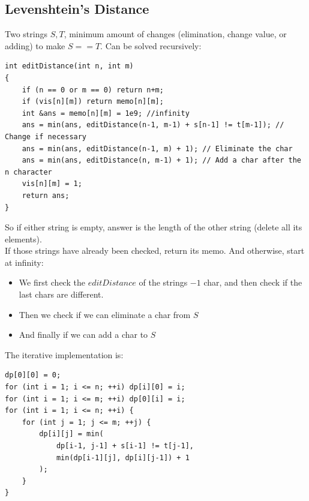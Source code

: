 \documentclass{IEEEtran}
\begin{document}
        \subsection{Levenshtein's Distance}
            Two strings $S,T$, minimum amount of changes (elimination, change value, or adding) to make $S == T$. Can be solved recursively:
            \begin{lstlisting}
int editDistance(int n, int m) 
{ 
	if (n == 0 or m == 0) return n+m;
	if (vis[n][m]) return memo[n][m];
	int &ans = memo[n][m] = 1e9; //infinity
	ans = min(ans, editDistance(n-1, m-1) + s[n-1] != t[m-1]); // Change if necessary
	ans = min(ans, editDistance(n-1, m) + 1); // Eliminate the char
	ans = min(ans, editDistance(n, m-1) + 1); // Add a char after the n character
	vis[n][m] = 1;
	return ans;
}
            \end{lstlisting}
            So if either string is empty, answer is the length of the other string (delete all its elements).\\
            If those strings have already been checked, return its memo. And otherwise, start at infinity:
            \begin{itemize}
                \item We first check the $editDistance$ of the strings $-1$ char, and then check if the last chars are different.
                \item Then we check if we can eliminate a char from $S$
                \item And finally if we can add a char to $S$
            \end{itemize}
            The iterative implementation is:
            \begin{lstlisting}
dp[0][0] = 0;
for (int i = 1; i <= n; ++i) dp[i][0] = i;
for (int i = 1; i <= m; ++i) dp[0][i] = i;
for (int i = 1; i <= n; ++i) {
	for (int j = 1; j <= m; ++j) {
		dp[i][j] = min(
			dp[i-1, j-1] + s[i-1] != t[j-1],
			min(dp[i-1][j], dp[i][j-1]) + 1
		);
	}
}
            \end{lstlisting}
\end{document}
